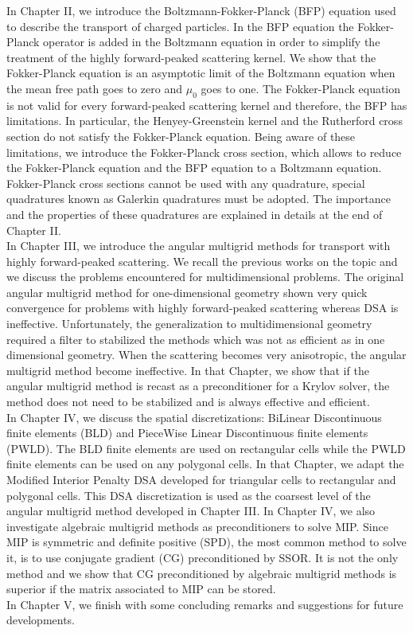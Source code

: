 \noindent In Chapter II, we introduce the Boltzmann-Fokker-Planck (BFP)
equation used to describe the transport of charged particles. In the BFP equation
the Fokker-Planck operator is added in the Boltzmann equation in order to simplify
the treatment of the highly forward-peaked scattering kernel. We show that the
Fokker-Planck equation is an asymptotic limit of the Boltzmann equation when the
mean free path goes to zero and $\mu_0$ goes to one. The Fokker-Planck
equation is not valid for every forward-peaked scattering kernel and
therefore, the BFP has limitations. In particular, the Henyey-Greenstein kernel
and the Rutherford cross section do not satisfy the Fokker-Planck equation.
Being aware of these limitations, we introduce the Fokker-Planck cross
section, which allows to reduce the Fokker-Planck equation and the BFP equation
to a Boltzmann equation. Fokker-Planck cross sections cannot be used with any
quadrature, special quadratures known as Galerkin quadratures must be adopted.
The importance and the properties of these quadratures are explained in
details at the end of Chapter II.\\

\noindent In Chapter III, we introduce the angular multigrid methods for 
transport with highly forward-peaked scattering. We recall the previous works 
on the topic and we discuss the problems encountered for multidimensional 
problems. The original angular multigrid method for one-dimensional geometry
shown very quick convergence for problems with highly forward-peaked
scattering whereas DSA is ineffective. Unfortunately, the generalization to
multidimensional geometry required a filter to stabilized the methods which
was not as efficient as in one dimensional geometry. When the scattering
becomes very anisotropic, the angular multigrid method become ineffective. In
that Chapter, we show that if the angular multigrid method is recast as a
preconditioner for a Krylov solver, the method does not need to be stabilized
and is always effective and efficient.\\

\noindent In Chapter IV, we discuss the spatial discretizations: BiLinear
Discontinuous finite elements (BLD) and PieceWise Linear Discontinuous finite
elements (PWLD). The BLD finite elements are used on rectangular cells while
the PWLD finite elements can be used on any polygonal cells. In that Chapter, 
we adapt the Modified Interior Penalty DSA developed for triangular cells to
rectangular and polygonal cells. This DSA discretization is used as the
coarsest level of the angular multigrid method developed in Chapter III. In
Chapter IV, we also investigate algebraic multigrid methods as preconditioners
to solve MIP. Since MIP is symmetric and definite positive (SPD), the most
common method to solve it, is to use conjugate gradient (CG) preconditioned by
SSOR. It is not the only method and we show that CG preconditioned by
algebraic multigrid methods is superior if the matrix associated to MIP can be
stored.\\

\noindent In Chapter V, we finish with some concluding remarks and suggestions for
future developments.
